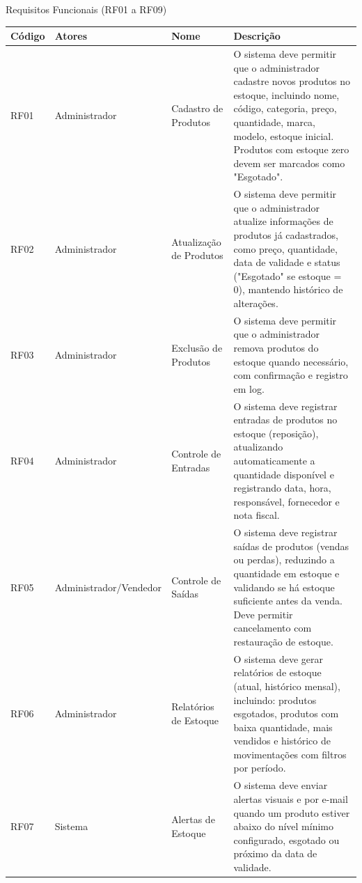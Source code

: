 \documentclass[
	12pt,				%
	openright,			%
	twoside,			%
	a4paper,			%
	english,			%
	french,				%
	spanish,			%
	brazil				%
	]{abntex2}
\begin{document}
\begin{quadro}[htb]
\caption{\label{quadro_rf1}Requisitos Funcionais (RF01 a RF09)}
\begin{tabular}{|p{1.0cm}|p{2.8cm}|p{4.2cm}|p{7.0cm}|}
    \hline
    \textbf{Código} & \textbf{Atores} & \textbf{Nome} & \textbf{Descrição} \\ \hline

    RF01 & Administrador & Cadastro de Produtos & O sistema deve permitir que o administrador cadastre novos produtos no estoque, incluindo nome, código, categoria, preço, quantidade, marca, modelo, estoque inicial. Produtos com estoque zero devem ser marcados como "Esgotado". \\ \hline

    RF02 & Administrador & Atualização de Produtos & O sistema deve permitir que o administrador atualize informações de produtos já cadastrados, como preço, quantidade, data de validade e status ("Esgotado" se estoque = 0), mantendo histórico de alterações. \\ \hline

    RF03 & Administrador & Exclusão de Produtos & O sistema deve permitir que o administrador remova produtos do estoque quando necessário, com confirmação e registro em log. \\ \hline

    RF04 & Administrador & Controle de Entradas & O sistema deve registrar entradas de produtos no estoque (reposição), atualizando automaticamente a quantidade disponível e registrando data, hora, responsável, fornecedor e nota fiscal. \\ \hline

    RF05 & Administrador/Vendedor & Controle de Saídas & O sistema deve registrar saídas de produtos (vendas ou perdas), reduzindo a quantidade em estoque e validando se há estoque suficiente antes da venda. Deve permitir cancelamento com restauração de estoque. \\ \hline

    RF06 & Administrador & Relatórios de Estoque & O sistema deve gerar relatórios de estoque (atual, histórico mensal), incluindo: produtos esgotados, produtos com baixa quantidade, mais vendidos e histórico de movimentações com filtros por período. \\ \hline

    RF07 & Sistema & Alertas de Estoque & O sistema deve enviar alertas visuais e por e-mail quando um produto estiver abaixo do nível mínimo configurado, esgotado ou próximo da data de validade. \\ \hline


\end{tabular}
\end{quadro}
\end{document}
